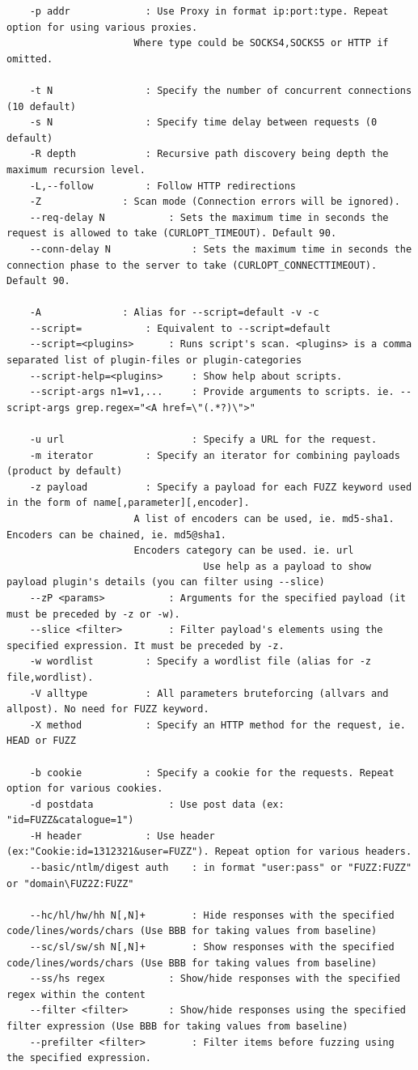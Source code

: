 \documentclass{article}
\begin{document}
\begin{lstlisting}
	-p addr			    : Use Proxy in format ip:port:type. Repeat option for using various proxies.
				      Where type could be SOCKS4,SOCKS5 or HTTP if omitted.
	
	-t N			    : Specify the number of concurrent connections (10 default)
	-s N			    : Specify time delay between requests (0 default)
	-R depth		    : Recursive path discovery being depth the maximum recursion level.
	-L,--follow		    : Follow HTTP redirections
	-Z			    : Scan mode (Connection errors will be ignored).
	--req-delay N		    : Sets the maximum time in seconds the request is allowed to take (CURLOPT_TIMEOUT). Default 90.
	--conn-delay N              : Sets the maximum time in seconds the connection phase to the server to take (CURLOPT_CONNECTTIMEOUT). Default 90.
	
	-A			    : Alias for --script=default -v -c
	--script=		    : Equivalent to --script=default
	--script=<plugins>	    : Runs script's scan. <plugins> is a comma separated list of plugin-files or plugin-categories
	--script-help=<plugins>	    : Show help about scripts.
	--script-args n1=v1,...     : Provide arguments to scripts. ie. --script-args grep.regex="<A href=\"(.*?)\">"
	
	-u url                      : Specify a URL for the request.
	-m iterator		    : Specify an iterator for combining payloads (product by default)
	-z payload		    : Specify a payload for each FUZZ keyword used in the form of name[,parameter][,encoder].
				      A list of encoders can be used, ie. md5-sha1. Encoders can be chained, ie. md5@sha1.
				      Encoders category can be used. ie. url
	                              Use help as a payload to show payload plugin's details (you can filter using --slice)
	--zP <params>		    : Arguments for the specified payload (it must be preceded by -z or -w).
	--slice <filter>	    : Filter payload's elements using the specified expression. It must be preceded by -z. 
	-w wordlist		    : Specify a wordlist file (alias for -z file,wordlist).
	-V alltype		    : All parameters bruteforcing (allvars and allpost). No need for FUZZ keyword.
	-X method		    : Specify an HTTP method for the request, ie. HEAD or FUZZ
	
	-b cookie		    : Specify a cookie for the requests. Repeat option for various cookies.
	-d postdata 		    : Use post data (ex: "id=FUZZ&catalogue=1")
	-H header  		    : Use header (ex:"Cookie:id=1312321&user=FUZZ"). Repeat option for various headers.
	--basic/ntlm/digest auth    : in format "user:pass" or "FUZZ:FUZZ" or "domain\FUZ2Z:FUZZ"
	
	--hc/hl/hw/hh N[,N]+	    : Hide responses with the specified code/lines/words/chars (Use BBB for taking values from baseline)
	--sc/sl/sw/sh N[,N]+	    : Show responses with the specified code/lines/words/chars (Use BBB for taking values from baseline)
	--ss/hs regex		    : Show/hide responses with the specified regex within the content
	--filter <filter>	    : Show/hide responses using the specified filter expression (Use BBB for taking values from baseline)
	--prefilter <filter>	    : Filter items before fuzzing using the specified expression.
\end{lstlisting}
\end{document}
